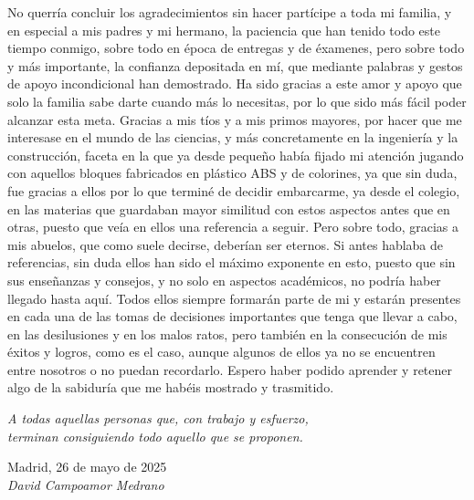 No querría concluir los agradecimientos sin hacer partícipe a toda mi familia, y en especial a mis padres y mi hermano, la paciencia que han tenido todo este tiempo conmigo, sobre todo en época de entregas y de éxamenes, pero sobre todo y más importante, la confianza depositada en mí, que mediante palabras y gestos de apoyo incondicional han demostrado. Ha sido gracias a este amor y apoyo que solo la familia sabe darte cuando más lo necesitas, por lo que sido más fácil poder alcanzar esta meta. Gracias a mis tíos y a mis primos mayores, por hacer que me interesase en el mundo de las ciencias, y más concretamente en la ingeniería y la construcción, faceta en la que ya desde pequeño había fijado mi atención jugando con aquellos bloques fabricados en plástico ABS y de colorines, ya que sin duda, fue gracias a ellos por lo que terminé de decidir embarcarme, ya desde el colegio, en las materias que guardaban mayor similitud con estos aspectos antes que en otras, puesto que veía en ellos una referencia a seguir. Pero sobre todo, gracias a mis abuelos, que como suele decirse, deberían ser eternos. Si antes hablaba de referencias, sin duda ellos han sido el máximo exponente en esto, puesto que sin sus enseñanzas y consejos, y no solo en aspectos académicos, no podría haber llegado hasta aquí. Todos ellos siempre formarán parte de mi y estarán presentes en cada una de las tomas de decisiones importantes que tenga que llevar a cabo, en las desilusiones y en los malos ratos, pero también en la consecución de mis éxitos y logros, como es el caso, aunque algunos de ellos ya no se encuentren entre nosotros o no puedan recordarlo. Espero haber podido aprender y retener algo de la sabiduría que me habéis mostrado y trasmitido.\\

\begin{flushright}
		\emph{A todas aquellas personas que, con trabajo y esfuerzo,\\
 terminan consiguiendo todo aquello que se proponen.}\\
		\par
		\vspace{1.0 cm}
		Madrid, 26 de mayo de 2025\\ %
		\emph{David Campoamor Medrano}
\end{flushright}

\thispagestyle{empty}

